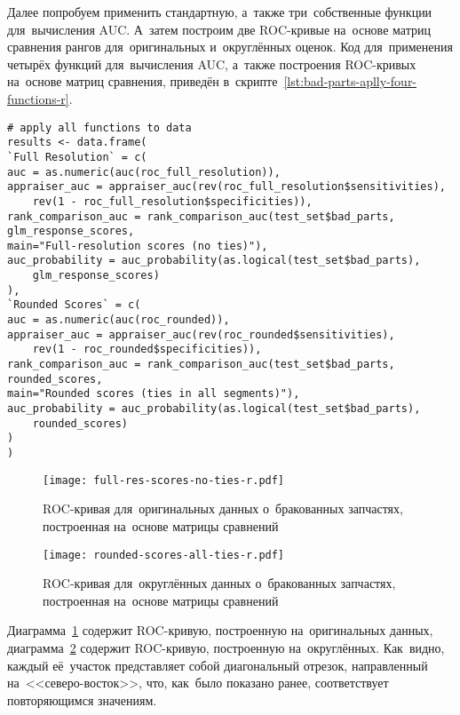 \documentclass[]{scrreprt}
\begin{document}
Далее попробуем применить стандартную, а~также три~собственные функции для~вычисления AUC. А~затем построим две ROC-кривые на~основе матриц сравнения рангов для~оригинальных и~округлённых оценок. Код для~применения четырёх функций для~вычисления AUC, а~также построения ROC-кривых на~основе матриц сравнения, приведён в~скрипте~\ref{lst:bad-parts-aplly-four-functions-r}.
%
\begin{lstlisting}[float, caption = Применение четырёх функций для~вычимсления AUC и~построение ROC-кривых на~основе матриц сравнения для~оригинальных и~округлённых оценок, firstnumber=1, label= lst:bad-parts-aplly-four-functions-r]
# apply all functions to data
results <- data.frame(
`Full Resolution` = c(
auc = as.numeric(auc(roc_full_resolution)),
appraiser_auc = appraiser_auc(rev(roc_full_resolution$sensitivities),
	rev(1 - roc_full_resolution$specificities)),
rank_comparison_auc = rank_comparison_auc(test_set$bad_parts,
glm_response_scores, 
main="Full-resolution scores (no ties)"),
auc_probability = auc_probability(as.logical(test_set$bad_parts),
	glm_response_scores)
),
`Rounded Scores` = c( 
auc = as.numeric(auc(roc_rounded)),
appraiser_auc = appraiser_auc(rev(roc_rounded$sensitivities),
	rev(1 - roc_rounded$specificities)),
rank_comparison_auc = rank_comparison_auc(test_set$bad_parts, rounded_scores,
main="Rounded scores (ties in all segments)"),
auc_probability = auc_probability(as.logical(test_set$bad_parts),
	rounded_scores)
)
)
\end{lstlisting}
%
\begin{figure}[ht]
	\centering
	\texttt{[image: full-res-scores-no-ties-r.pdf]}
	\caption{ROC-кривая для~оригинальных данных о~бракованных запчастях, построенная на~основе матрицы сравнений}
	\label{fig:bad-parts-ROC-original-r}
\end{figure}
%
\begin{figure}[ht]
	\centering
	\texttt{[image: rounded-scores-all-ties-r.pdf]}
	\caption{ROC-кривая для~округлённых данных о~бракованных запчастях, построенная на~основе матрицы сравнений}
	\label{fig:bad-parts-ROC-rounded-r}
\end{figure}
%

Диаграмма~\ref{fig:bad-parts-ROC-original-r} содержит ROC-кривую, построенную на~оригинальных данных, диаграмма~\ref{fig:bad-parts-ROC-rounded-r} содержит ROC-кривую, построенную на~округлённых. Как~видно, каждый её~участок представляет собой диагональный отрезок, направленный на~<<северо-восток>>, что, как~было показано ранее, соответствует повторяющимся значениям.
\end{document}
